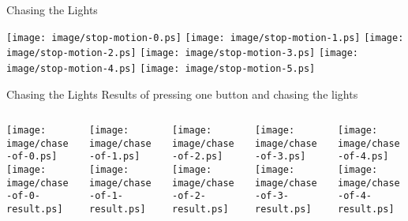\begin{frame}{Chasing the Lights}
	\begin{center}
		\texttt{[image: image/stop-motion-0.ps]}
		\hfill
		\pause
		\texttt{[image: image/stop-motion-1.ps]}
		\hfill
		\pause
		\texttt{[image: image/stop-motion-2.ps]}
		\hfill
		\pause
		\texttt{[image: image/stop-motion-3.ps]}
		\hfill
		\pause
		\texttt{[image: image/stop-motion-4.ps]}
		\hfill
		\pause
		\texttt{[image: image/stop-motion-5.ps]}
	\end{center}
\end{frame}

\begin{frame}{Chasing the Lights}
	Results of pressing one button and chasing the lights
	\begin{columns}[T]
		\begin{column}{0.18\textwidth}
			\texttt{[image: image/chase-of-0.ps]}\\
			\bigskip
			\texttt{[image: image/chase-of-0-result.ps]}\\
		\end{column}
		\begin{column}{0.18\textwidth}
			\texttt{[image: image/chase-of-1.ps]}\\
			\bigskip
			\texttt{[image: image/chase-of-1-result.ps]}\\
		\end{column}
		\begin{column}{0.18\textwidth}
			\texttt{[image: image/chase-of-2.ps]}\\
			\bigskip
			\texttt{[image: image/chase-of-2-result.ps]}\\
		\end{column}
		\begin{column}{0.18\textwidth}
			\texttt{[image: image/chase-of-3.ps]}\\
			\bigskip
			\texttt{[image: image/chase-of-3-result.ps]}\\
		\end{column}
		\begin{column}{0.18\textwidth}
			\texttt{[image: image/chase-of-4.ps]}\\
			\bigskip
			\texttt{[image: image/chase-of-4-result.ps]}\\
		\end{column}
	\end{columns}
\end{frame}

